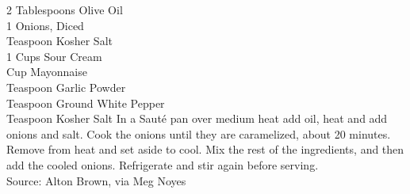 {2 Tablespoons Olive Oil \\
 1 Onions, Diced \\
  Teaspoon Kosher Salt \\
 1 Cups Sour Cream \\
  Cup Mayonnaise \\
  Teaspoon Garlic Powder \\
  Teaspoon Ground White Pepper \\
  Teaspoon Kosher Salt}
{In a Saut\'{e} pan over medium heat add oil, heat and add onions and salt. Cook the onions until they are caramelized, about 20 minutes. Remove from heat and set aside to cool. Mix the rest of the ingredients, and then add the cooled onions. Refrigerate and stir again before serving. \\
Source: Alton Brown, via Meg Noyes}

